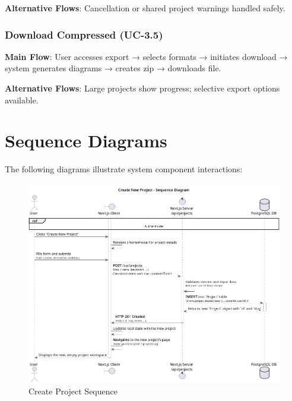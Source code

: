\textbf{Alternative Flows}: Cancellation or shared project warnings handled safely.

\subsubsection{Download Compressed (UC-3.5)}
\textbf{Main Flow}: User accesses export → selects formats → initiates download → system generates diagrams → creates zip → downloads file.

\textbf{Alternative Flows}: Large projects show progress; selective export options available.


\section{Sequence Diagrams}

The following diagrams illustrate system component interactions:

\begin{figure}[H]
\centering
\includegraphics[width=1\textwidth]{conception/SprintIII/sequence_diagrams/sequence_projectManagement_3_1_CreateNewProject.png}
\caption{Create Project Sequence}
\label{fig:seq_create_project}
\end{figure}

